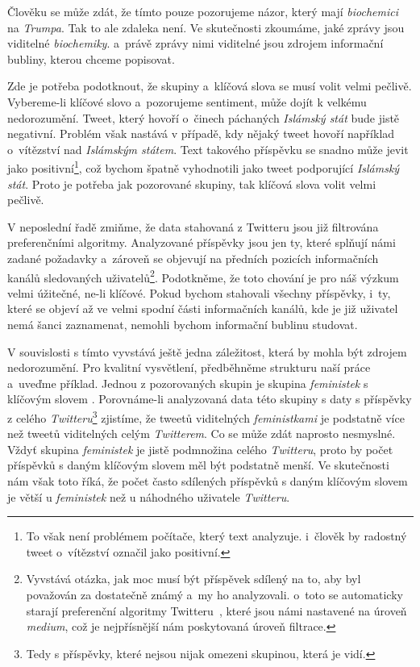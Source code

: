 \documentclass[12pt, a4paper]{article}
\numberwithin{equation}{section} 	%
\begin{document}
Člověku se může zdát, že tímto pouze pozorujeme názor, který mají \textit{biochemici} na \textit{Trumpa}. Tak to ale zdaleka není. Ve skutečnosti zkoumáme, jaké zprávy jsou viditelné \textit{biochemiky}. a~právě zprávy nimi viditelné jsou zdrojem informační bubliny, kterou chceme popisovat.

Zde je potřeba podotknout, že skupiny a~klíčová slova se musí volit velmi pečlivě. Vybereme-li klíčové slovo \textit{} a~pozorujeme sentiment, může dojít k velkému nedorozumění. Tweet, který hovoří o~činech páchaných \textit{Islámský stát} bude jistě negativní. Problém však nastává v případě, kdy nějaký tweet hovoří například o~vítězství nad \textit{Islámským státem}. Text takového příspěvku se snadno může jevit jako positivní\footnote{To však není problémem počítače, který text analyzuje. i~člověk by radostný tweet o~vítězství označil jako positivní.}, což bychom špatně vyhodnotili jako tweet podporující \textit{Islámský stát}. Proto je potřeba jak pozorované skupiny, tak klíčová slova volit velmi pečlivě.

V neposlední řadě zmiňme, že data stahovaná z Twitteru jsou již filtrována preferenčními algoritmy. Analyzované příspěvky jsou jen ty, které splňují námi zadané požadavky a~zároveň se objevují na předních pozicích informačních kanálů sledovaných uživatelů\footnote{Vyvstává otázka, jak moc musí být příspěvek sdílený na to, aby byl považován za dostatečně známý a~my ho analyzovali. o~toto se automaticky starají preferenční algoritmy Twitteru~\cite{twitterAPI}, které jsou námi nastavené na úroveň \textit{medium}, což je nejpřísnější nám poskytovaná úroveň filtrace.}. Podotkněme, že toto chování je pro náš výzkum velmi úžitečné, ne-li klíčové. Pokud bychom stahovali všechny příspěvky, i~ty, které se objeví až ve velmi spodní části informačních kanálů, kde je již uživatel nemá šanci zaznamenat, nemohli bychom informační bublinu studovat.

V souvislosti s tímto vyvstává ještě jedna záležitost, která by mohla být zdrojem nedorozumění. Pro kvalitní vysvětlení, předběhněme strukturu naší práce a~uveďme příklad. Jednou z pozorovaných skupin je skupina \textit{feministek} s klíčovým slovem \textit{}. Porovnáme-li analyzovaná data této skupiny s daty s příspěvky z celého \textit{Twitteru}\footnote{Tedy s příspěvky, které nejsou nijak omezeni skupinou, která je vidí.} zjistíme, že tweetů viditelných \textit{feministkami} je podstatně více než tweetů viditelných celým \textit{Twitterem}. Co se může zdát naprosto nesmyslné. Vždyť skupina \textit{feministek} je jistě podmnožina celého \textit{Twitteru}, proto by počet příspěvků s daným klíčovým slovem měl být podstatně menší. Ve skutečnosti nám však toto říká, že počet často sdílených příspěvků s daným klíčovým slovem je větší u \textit{feministek} než u náhodného uživatele \textit{Twitteru}.
\end{document}
